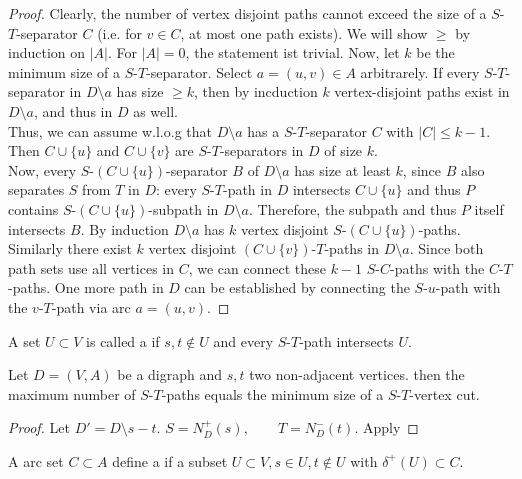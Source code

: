 \begin{proof}
Clearly, the number of vertex disjoint paths cannot exceed the size of a
$S$-$T$-separator $C$ (i.e. for $v \in C$, at most one path exists). We will
show $\geq$ by induction on $|A|$. For $|A|=0$, the statement ist trivial.
Now, let $k$ be the minimum size of a $S$-$T$-separator. Select $a=(u,v) \in
A$ arbitrarely. If every $S$-$T$-separator in $D \setminus a$ has size $\geq
k$, then by incduction $k$ vertex-disjoint paths exist in $D\setminus a$,
and thus in $D$ as well.\\
Thus, we can assume w.l.o.g that $D \setminus a $ has a $S$-$T$-separator $C$
with $|C| \leq k-1$. Then $C\cup \{u\}$ and $C\cup \{v\}$ are
$S$-$T$-separators in $D$ of size $k$.\\
Now, every $S$-$(C\cup\{u\})$-separator $B$ of $D \setminus a$ has size at
least $k$, since $B$ also separates $S$ from $T$ in $D$: every $S$-$T$-path in
$D$ intersects $C\cup\{u\}$ and thus $P$ contains $S$-$(C\cup \{u\})$-subpath
in $D\setminus a$. Therefore, the subpath and thus $P$ itself intersects
$B$. By induction $D\setminus a$ has $k$ vertex disjoint
$S$-$(C\cup\{u\})$-paths. Similarly there exist $k$ vertex disjoint
$(C\cup\{v\})$-$T$-paths in $D \setminus a$. Since both path sets use all
vertices in $C$, we can connect these $k-1$ $S$-$C$-paths with the $C$-$T$-paths.
One more path in $D$ can be established by connecting the $S$-$u$-path with
the $v$-$T$-path via arc $a=(u,v)$.
\end{proof}

\begin{defn}
A set $U\subset V$ is called a  if $s,t \notin U$
and every $S$-$T$-path intersects $U$.
\end {defn}

\begin{cor}
Let $D=(V,A)$ be a digraph and $s,t$ two non-adjacent vertices. then the
maximum number of  $S$-$T$-paths equals the
minimum size of a $S$-$T$-vertex cut.
\end{cor}
\begin{proof}
Let $D'=D\setminus s - t.$
$S=N^+_D(s), \qquad T=N_D^-(t)$. Apply %
\end{proof} 

\begin{defn}
A arc set $C\subset A$ define a  if a subset
$U\subset V, s \in U, t \notin U$ with $\delta^+(U)\subset C$.
\end{defn}

